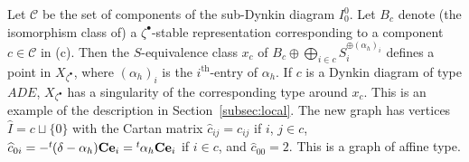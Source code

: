 \documentclass[10pt,a4paper]{amsart}
\theoremstyle{definition}
\numberwithin{equation}{section}
\newcommand{\subsecref}[1]{Section~\ref{#1}}
\newcommand{\lsp}[2]{{\mskip-.3mu}{}^{#1}\mskip-1mu{#2}}
\newcommand{\bC}{{\mathbf C}} %
\newcommand{\be}{{\mathbf e}}
\begin{document}
Let $\mathcal C$ be the set of components of the sub-Dynkin diagram
$I_0^0$. Let $B_c$ denote (the isomorphism class of) a
$\zeta^\bullet$-stable representation corresponding to a component
$c\in \mathcal C$ in (c). Then the $S$-equivalence class $x_c$ of
\(
   B_c\oplus \bigoplus_{i\in c} S_i^{\oplus (\alpha_h)_i}
\)
def\/ines a point in $X_{\zeta^\bullet}$, where $(\alpha_h)_i$ is the
$i^{\mathrm{th}}$-entry of $\alpha_h$. If $c$ is a Dynkin diagram of
type $ADE$, $X_{\zeta^\bullet}$ has a singularity of the corresponding type
around $x_c$. This is an example of the description in
\subsecref{subsec:local}. The new graph has vertices
$\widehat I = c\sqcup\{ 0\}$ with the Cartan matrix
\(
   \widehat{c}_{ij} = c_{ij}
\)
if $i$, $j\in c$,
\(
   \widehat{c}_{0i} = - \lsp{t}{(\delta - \alpha_h)}\bC \be_i
   = \lsp{t}{\alpha_h} \bC \be_i
\)
if $i\in c$,
and
$\widehat{c}_{00} = 2$. This is a graph of af\/f\/ine type.
\end{document}
